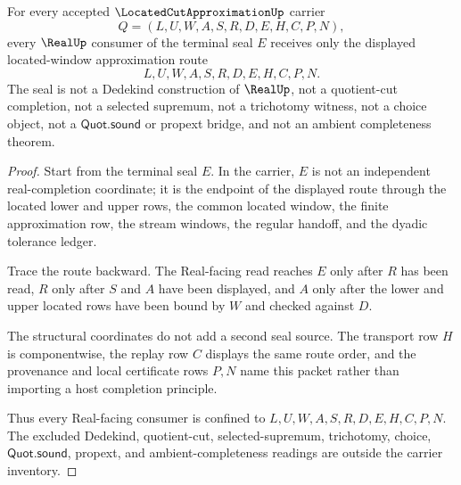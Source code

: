 \begin{theorem}
\label{thm:located-cut-approximation-real-seal-nonescape}
For every accepted $\LocatedCutApproximationUp$ carrier
$$
Q=(L,U,W,A,S,R,D,E,H,C,P,N),
$$
every $\RealUp$ consumer of the terminal seal $E$ receives only the displayed located-window approximation route
$$
L,U,W,A,S,R,D,E,H,C,P,N .
$$
The seal is not a Dedekind construction of $\RealUp$, not a quotient-cut completion, not a selected supremum, not a trichotomy witness, not a choice object, not a $\mathsf{Quot.sound}$ or propext bridge, and not an ambient completeness theorem.
\end{theorem}
\begin{proof}
Start from the terminal seal $E$. In the carrier, $E$ is not an independent real-completion coordinate; it is the endpoint of the displayed route through the located lower and upper rows, the common located window, the finite approximation row, the stream windows, the regular handoff, and the dyadic tolerance ledger.

Trace the route backward. The Real-facing read reaches $E$ only after $R$ has been read, $R$ only after $S$ and $A$ have been displayed, and $A$ only after the lower and upper located rows have been bound by $W$ and checked against $D$.

The structural coordinates do not add a second seal source. The transport row $H$ is componentwise, the replay row $C$ displays the same route order, and the provenance and local certificate rows $P,N$ name this packet rather than importing a host completion principle.

Thus every Real-facing consumer is confined to $L,U,W,A,S,R,D,E,H,C,P,N$. The excluded Dedekind, quotient-cut, selected-supremum, trichotomy, choice, $\mathsf{Quot.sound}$, propext, and ambient-completeness readings are outside the carrier inventory.
\end{proof}


